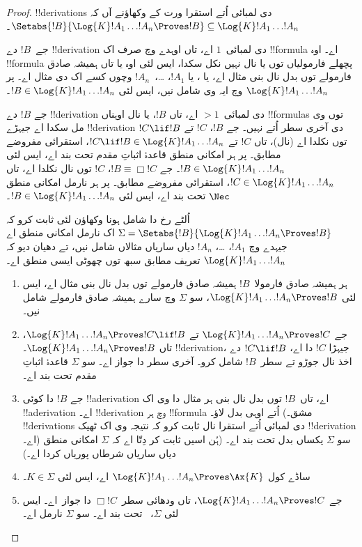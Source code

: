 \documentclass[../../../include/open-logic-section]{subfiles}
\begin{document}
\begin{proof}
  !!{derivation}s دی لمبائی اُتے استقرا ورت کے وکھاؤنے آں کہ
  $\Setabs{!B}{\Log{K} !A_1 \dots !A_n \Proves !B} \subseteq
  \Log{K} !A_1 \dots !A_n$۔

  جے~$!B$ دے !!{derivation} دی لمبائی~$1$ اے، تاں اوہدے وچ صرف اک !!{formula} اے۔ اوہ !!{formula} پچھلے فارمولیاں توں
  \MP{} یا \Nec نال نہیں نکل سکدا، ایس لئی اوہ یا تاں ہمیشہ صادق فارمولے توں بدل نال بنی مثال اے، یا
  ، یا $!A_1$، \dots،~$!A_n$ وچوں کسے اک دی مثال اے۔ پر $\Log{K}!A_1\dots!A_n$ وچ ایہ وی شامل نیں، ایس لئی $!B \in \Log{K}!A_1 \dots !A_n$۔

  جے $!B$ دے !!{derivation} دی لمبائی~$> 1$ اے، تاں $!B$، \MP{} یا \Nec{} نال اوہناں !!{formula}s توں وی مل سکدا اے جیہڑے !!{derivation} دی آخری سطر اُتے نہیں۔ جے $!B$،
  $!C$ تے $!C \lif !B$ توں نکلدا اے (\MP نال)، تاں $!C$ تے $!C \lif !B \in
  \Log{K}!A_1 \dots !A_n$، استقرائی مفروضے مطابق۔ پر ہر امکانی منطق قاعدۂ اثباتِ مقدم تحت بند اے، ایس لئی $!B \in \Log{K}!A_1 \dots
  !A_n$۔ جے $!B \equiv \Box !C$، $!C$ توں \Nec نال نکلدا اے، تاں $!C
  \in \Log{K}!A_1 \dots !A_n$، استقرائی مفروضے مطابق۔ پر ہر نارمل امکانی منطق $\Nec$ تحت بند اے، ایس لئی $!B \in
  \Log{K}!A_1\dots!A_n$۔

  اُلٹے رخ دا شامل ہونا وکھاؤن لئی ثابت کرو کہ
  $\Sigma = \Setabs{!B}{\Log{K} !A_1 \dots !A_n \Proves !B }$ اک نارمل امکانی منطق اے جیہدے وچ $!A_1$،
  \dots، $!A_n$ دیاں ساریاں مثالاں شامل نیں، تے دھیان دیو کہ $\Log{K} !A_1 \dots !A_n$ تعریف مطابق سبھ توں چھوٹی ایسی منطق اے۔
  \begin{enumerate}
    \item ہر ہمیشہ صادق فارمولا~$!B$ ہمیشہ صادق فارمولے توں بدل نال بنی مثال اے، ایس لئی
      $\Log{K}!A_1\dots!A_n \Proves !B$، سو $\Sigma$ وچ سارے ہمیشہ صادق فارمولے شامل نیں۔
    \item جے $\Log{K}!A_1\dots!A_n \Proves !C$ تے
      $\Log{K}!A_1\dots!A_n \Proves !C \lif !B$، تاں
      $\Log{K}!A_1\dots!A_n \Proves !B$۔ !!{derivation}، جیہڑا
      $!C$ دا اے، $!C \lif !B$ دے اخذ نال جوڑو تے سطر~$!B$ شامل کرو۔ آخری سطر دا جواز \MP{} اے۔ سو $\Sigma$ قاعدۂ اثباتِ مقدم تحت بند اے۔
    \item جے $!B$ دا کوئی !!a{derivation} اے، تاں~$!B$ توں بدل نال بنی ہر مثال دا وی اک !!a{derivation} اے۔ !!{derivation} وچ ہر !!{formula} اُتے اوہی بدل لاؤ۔ (مشق۔ !!{derivation}s دی لمبائی اُتے استقرا نال ثابت کرو کہ نتیجہ وی اک ٹھیک !!{derivation} اے۔) سو $\Sigma$ یکساں بدل تحت بند اے۔ (ہُن اسیں ثابت کر دِتّا اے کہ $\Sigma$ امکانی منطق دیاں ساریاں شرطاں پوریاں کردا اے۔)
    \item ساڈے کول $\Log{K}!A_1\dots!A_n \Proves \Ax{K}$ اے، ایس لئی $K \in \Sigma$۔
    \item جے $\Log{K}!A_1\dots!A_n \Proves !C$، تاں ودھائی سطر~$\Box !C$ دا جواز~\Nec اے۔ ایس لئی $\Sigma$،
      ~\Nec تحت بند اے۔ سو $\Sigma$ نارمل اے۔
  \end{enumerate}
\end{proof}
\end{document}
